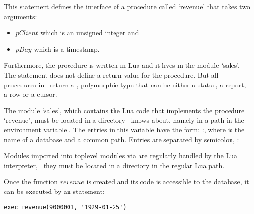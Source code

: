 This statement defines the interface of a procedure
called `revenue' that takes two arguments:
\begin{itemize}
\item $pClient$ which is an unsigned integer and
\item $pDay$ which is a timestamp.
\end{itemize}
Furthermore, the procedure is written in Lua and
it lives in the module `sales'.
The statement does not define a return value for the procedure.
But all procedures in \nowdb\ return a ,
polymorphic type that
can be either a status, a report, a row or a cursor.

The  module `sales',
which contains the Lua code that implements
the procedure `revenue',
must be located in a directory
\nowdb\ knows about, namely 
in a path in the environment variable
.
The entries in this variable have the form:
:,
where  is the name of a database
and  a common  path.
Entries are separated by semicolon, \eg:


Modules imported into toplevel modules via 
are regularly handled by the Lua interpreter, \ie\
they must be located in a directory in the regular
Lua path.

Once the function $revenue$ is created
and its code is accessible to the database, it
can be executed by an  statement:

\begin{sqlcode}
\begin{lstlisting}
exec revenue(9000001, '1929-01-25')
\end{lstlisting}
\end{sqlcode}

